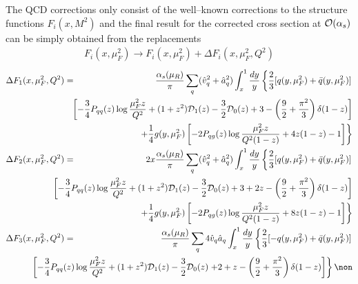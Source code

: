 The QCD corrections only consist of the well--known corrections to the
structure functions $F_i(x,M^2)$ and the final result for the corrected cross
section at ${\cal O}(\alpha_s)$ can be simply obtained from the replacements
\cite{pp-Hqq-NLO1,HVNLO-DS,Review-Michael} 
\begin{eqnarray}
F_i(x,\mu_F^2)  \to  F_i(x,\mu_F^2) + \Delta F_i(x,\mu_F^2,Q^2) 
\end{eqnarray}
%
\vspace*{-7mm}
\begin{eqnarray}
\Delta F_1(x,\mu_F^2,Q^2) & = & \frac{\alpha_s(\mu_R)}{\pi}\sum_q (\hat v_q^2+
\hat a_q^2)
\int_x^1 \frac{dy}{y} \left\{ \frac{2}{3} [q(y,\mu_F^2) + \bar q(y,\mu_F^2)]
\right. \nonumber \\
& &  \hspace*{-2cm}
\left[ -\frac{3}{4} P_{qq}(z) \log \frac{\mu_F^2z}{Q^2} + (1+z^2) {\cal D}_1(z)
- \frac{3}{2} {\cal D}_0(z) 
+ 3 - \left(
\frac{9}{2} + \frac{\pi^2}{3} \right) \delta(1-z) \right]
\nonumber \\
& & \hspace*{-2cm} \left. + \frac{1}{4} g(y,\mu_F^2) \left[ -2 P_{qg}(z) \log \frac{\mu_F^2z}
{Q^2(1-z)}
 + 4z(1-z) - 1 \right] \right\} \\
\Delta F_2(x,\mu_F^2,Q^2) & = & 2x\frac{\alpha_s(\mu_R)}{\pi}\sum_q (\hat v_q^2
+\hat a_q^2)
\int_x^1 \frac{dy}{y} \left\{ \frac{2}{3} [q(y,\mu_F^2) + \bar q(y,\mu_F^2)]
\right. \nonumber \\ & &  \hspace*{-2cm}
\left[ -\frac{3}{4} P_{qq}(z) \log \frac{\mu_F^2z}{Q^2} + (1+z^2) {\cal D}_1(z)
- \frac{3}{2} {\cal D}_0(z) 
+ 3 + 2z - \left(
\frac{9}{2} + \frac{\pi^2}{3} \right) \delta(1-z) \right]
\nonumber \\
& &  \hspace*{-2cm} \left. + \frac{1}{4} g(y,\mu_F^2) \left[ -2P_{qg}(z) \log \frac{\mu_F^2z}
{Q^2(1-z)}
+ 8z(1-z) - 1 \right] \right\} \\
\Delta F_3(x,\mu_F^2,Q^2) & = & \frac{\alpha_s(\mu_R)}{\pi} \sum_q 4 \hat v_q 
\hat a_q \int_x^1 \frac{dy}{y} \left\{ \frac{2}{3} [-q(y,\mu_F^2) + 
\bar q(y,\mu_F^2)]\right.  \\ 
& &  \hspace*{-2cm}
\left[ -\frac{3}{4} P_{qq}(z) \log \frac{\mu_F^2 z}{Q^2} + (1+z^2) {\cal D}_1(z)
- \frac{3}{2} {\cal D}_0(z) 
\left. + 2 + z - \left(
\frac{9}{2} + \frac{\pi^2}{3} \right) \delta(1-z) \right] \right\} \non
\end{eqnarray}
